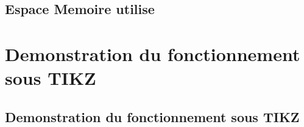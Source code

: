 \documentclass[pdftex]{beamer}
\begin{document}
\subsection[Espace Memoire utilisé]{Espace Memoire utilise}





\section[Demonstration du fonctionnement sous TIKZ]{Demonstration du fonctionnement sous TIKZ}

\subsection[Demonstration du fonctionnement sous TIKZ]{Demonstration du fonctionnement sous TIKZ}

\end{document}
